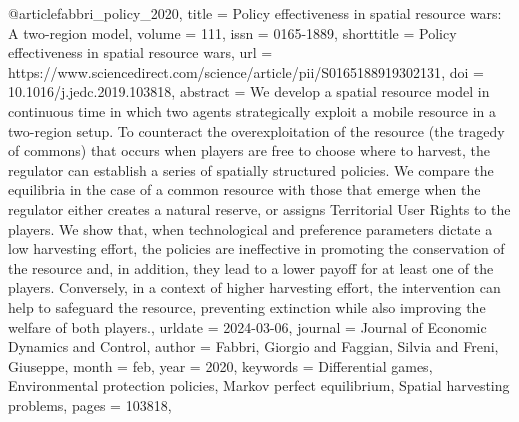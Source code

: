 {{{{@article{fabbri_policy_2020,
	title = {Policy effectiveness in spatial resource wars: {A} two-region model},
	volume = {111},
	issn = {0165-1889},
	shorttitle = {Policy effectiveness in spatial resource wars},
	url = {https://www.sciencedirect.com/science/article/pii/S0165188919302131},
	doi = {10.1016/j.jedc.2019.103818},
	abstract = {We develop a spatial resource model in continuous time in which two agents strategically exploit a mobile resource in a two-region setup. To counteract the overexploitation of the resource (the tragedy of commons) that occurs when players are free to choose where to harvest, the regulator can establish a series of spatially structured policies. We compare the equilibria in the case of a common resource with those that emerge when the regulator either creates a natural reserve, or assigns Territorial User Rights to the players. We show that, when technological and preference parameters dictate a low harvesting effort, the policies are ineffective in promoting the conservation of the resource and, in addition, they lead to a lower payoff for at least one of the players. Conversely, in a context of higher harvesting effort, the intervention can help to safeguard the resource, preventing extinction while also improving the welfare of both players.},
	urldate = {2024-03-06},
	journal = {Journal of Economic Dynamics and Control},
	author = {Fabbri, Giorgio and Faggian, Silvia and Freni, Giuseppe},
	month = feb,
	year = {2020},
	keywords = {Differential games, Environmental protection policies, Markov perfect equilibrium, Spatial harvesting problems},
	pages = {103818},
}

}}}}
